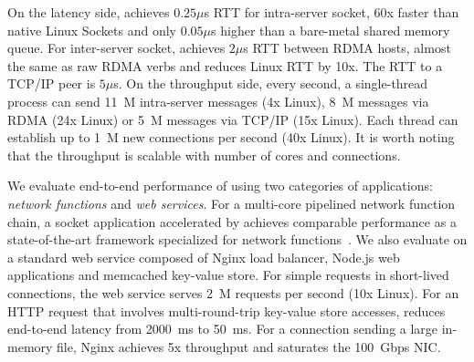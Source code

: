 On the latency side, \sys{} achieves $0.25\mu$s RTT for intra-server socket, 60x faster than native Linux Sockets and only $0.05\mu$s higher than a bare-metal shared memory queue. For inter-server socket, \sys{} achieves $2\mu$s RTT between RDMA hosts, almost the same as raw RDMA verbs and reduces Linux RTT by 10x. The RTT to a TCP/IP peer is $5\mu$s. On the throughput side, every second, a single-thread process can send 11~M intra-server messages (4x Linux), 8~M messages via RDMA (24x Linux) or 5~M messages via TCP/IP (15x Linux). Each thread can establish up to 1~M new connections per second (40x Linux). It is worth noting that the throughput is scalable with number of cores and connections.

We evaluate end-to-end performance of \sys{} using two categories of applications: \textit{network functions} and \textit{web services}. For a multi-core pipelined network function chain, a socket application accelerated by \sys{} achieves comparable performance as a state-of-the-art framework specialized for network functions~\cite{panda2016netbricks}. We also evaluate \sys{} on a standard web service composed of Nginx load balancer, Node.js web applications and memcached key-value store. For simple requests in short-lived connections, the web service serves 2~M requests per second (10x Linux). For an HTTP request that involves multi-round-trip key-value store accesses, \sys{} reduces end-to-end latency from 2000~ms to 50~ms. For a connection sending a large in-memory file, Nginx achieves 5x throughput and saturates the 100~Gbps NIC.
